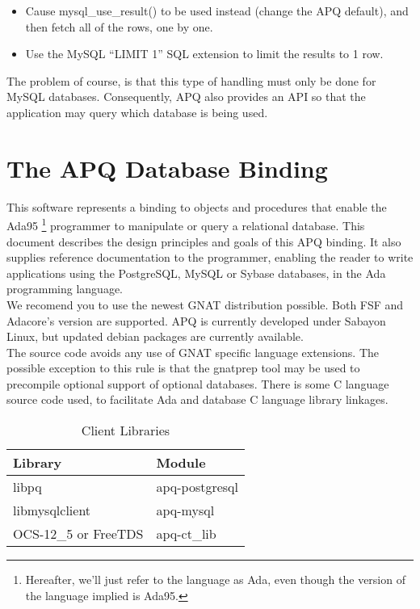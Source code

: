 \documentclass[english,letterpaper]{book}
\begin{document}
\begin{itemize}
   \item Cause mysql\_use\_result() to be used instead (change the APQ default),
         and then fetch all of the rows, one by one.
   \item Use the MySQL ``LIMIT 1'' SQL extension to limit the results to
         1 row.
\end{itemize}

The problem of course, is that this type of handling must only be
done for MySQL databases. Consequently, APQ also provides an API so
that the application may query which database is being used.


\section{The APQ Database Binding}

This software represents a binding to objects and procedures that
enable the Ada95%
\footnote{Hereafter, we'll just refer to the language as Ada, even though the
version of the language implied is Ada95.%
} programmer to manipulate or query a relational database. This document
describes the design principles and goals of this APQ binding. It
also supplies reference documentation to the programmer, enabling
the reader to write applications using the PostgreSQL, MySQL 
or Sybase  databases,
in the Ada programming language.\\

We recomend you to use the newest GNAT distribution possible. Both FSF and Adacore's version are supported.
APQ is currently developed under Sabayon Linux, but updated debian packages are currently available.\\

The source code avoids any use of GNAT specific language extensions.
The possible exception to this rule is that the gnatprep tool may
be used to precompile optional support of optional databases. There
is some C language source code used, to facilitate Ada and database
C language library linkages.

\begin{table}
   \begin{center}
   \begin{tabular}{ll}
   Library              &  Module         \\
   \hline 
   libpq                &  apq-postgresql \\
   libmysqlclient       &  apq-mysql      \\
   OCS-12\_5 or FreeTDS &  apq-ct\_lib    \\
   \end{tabular}
   \end{center}
\caption{Client Libraries}\label{t:ClientLib}
\end{table}
\end{document}
